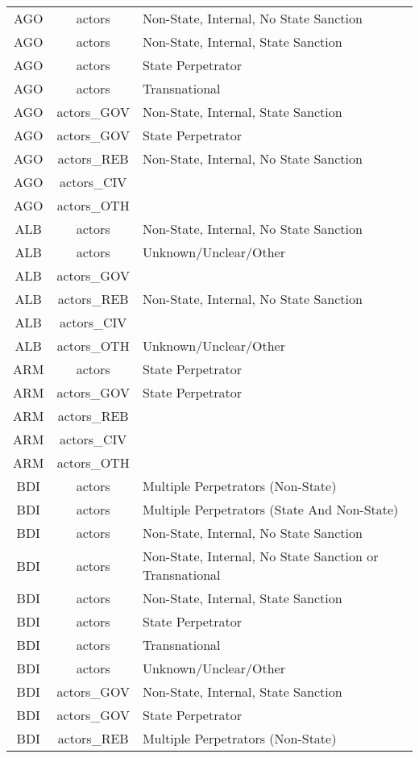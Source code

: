 \documentclass[12pt]{article}
\begin{document}
\begin{center}
\begin{longtable}{|c|c|p{10cm}|}
  AGO & actors & Non-State, Internal, No State Sanction \\ 
  AGO & actors & Non-State, Internal, State Sanction \\ 
  AGO & actors & State Perpetrator \\ 
  AGO & actors & Transnational \\ 
  AGO & actors\_GOV & Non-State, Internal, State Sanction \\ 
  AGO & actors\_GOV & State Perpetrator \\ 
  AGO & actors\_REB & Non-State, Internal, No State Sanction \\ 
  AGO & actors\_CIV &  \\ 
  AGO & actors\_OTH &  \\ 
  ALB & actors & Non-State, Internal, No State Sanction \\ 
  ALB & actors & Unknown/Unclear/Other \\ 
  ALB & actors\_GOV &  \\ 
  ALB & actors\_REB & Non-State, Internal, No State Sanction \\ 
  ALB & actors\_CIV &  \\ 
  ALB & actors\_OTH & Unknown/Unclear/Other \\ 
  ARM & actors & State Perpetrator \\ 
  ARM & actors\_GOV & State Perpetrator \\ 
  ARM & actors\_REB &  \\ 
  ARM & actors\_CIV &  \\ 
  ARM & actors\_OTH &  \\ 
  BDI & actors & Multiple Perpetrators (Non-State) \\ 
  BDI & actors & Multiple Perpetrators (State And Non-State) \\ 
  BDI & actors & Non-State, Internal, No State Sanction \\ 
  BDI & actors & Non-State, Internal, No State Sanction or Transnational \\ 
  BDI & actors & Non-State, Internal, State Sanction \\ 
  BDI & actors & State Perpetrator \\ 
  BDI & actors & Transnational \\ 
  BDI & actors & Unknown/Unclear/Other \\ 
  BDI & actors\_GOV & Non-State, Internal, State Sanction \\ 
  BDI & actors\_GOV & State Perpetrator \\ 
  BDI & actors\_REB & Multiple Perpetrators (Non-State) \\ 

\end{longtable}
\end{center}
\end{document}
